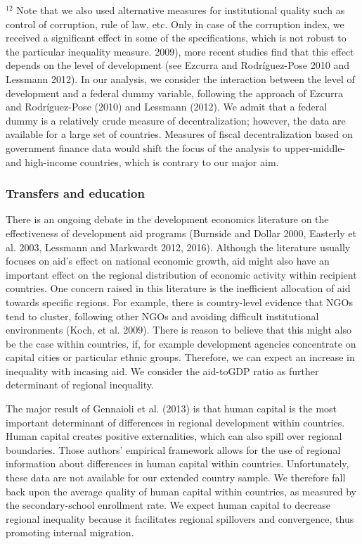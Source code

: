 \documentclass[10pt]{article}
\begin{document}
${ }^{12}$ Note that we also used alternative measures for institutional quality such as control of corruption, rule of law, etc. Only in case of the corruption index, we received a significant effect in some of the specifications, which is not robust to the particular inequality measure. 2009), more recent studies find that this effect depends on the level of development (see Ezcurra and Rodríguez-Pose 2010 and Lessmann 2012). In our analysis, we consider the interaction between the level of development and a federal dummy variable, following the approach of Ezcurra and Rodríguez-Pose (2010) and Lessmann (2012). We admit that a federal dummy is a relatively crude measure of decentralization; however, the data are available for a large set of countries. Measures of fiscal decentralization based on government finance data would shift the focus of the analysis to upper-middle- and high-income countries, which is contrary to our major aim.

\subsubsection{Transfers and education}
There is an ongoing debate in the development economics literature on the effectiveness of development aid programs (Burnside and Dollar 2000, Easterly et al. 2003, Lessmann and Markwardt 2012, 2016). Although the literature usually focuses on aid's effect on national economic growth, aid might also have an important effect on the regional distribution of economic activity within recipient countries. One concern raised in this literature is the inefficient allocation of aid towards specific regions. For example, there is country-level evidence that NGOs tend to cluster, following other NGOs and avoiding difficult institutional environments (Koch, et al. 2009). There is reason to believe that this might also be the case within countries, if, for example development agencies concentrate on capital cities or particular ethnic groups. Therefore, we can expect an increase in inequality with incasing aid. We consider the aid-toGDP ratio as further determinant of regional inequality.

The major result of Gennaioli et al. (2013) is that human capital is the most important determinant of differences in regional development within countries. Human capital creates positive externalities, which can also spill over regional boundaries. Those authors' empirical framework allows for the use of regional information about differences in human capital within countries. Unfortunately, these data are not available for our extended country sample. We therefore fall back upon the average quality of human capital within countries, as measured by the secondary-school enrollment rate. We expect human capital to decrease regional inequality because it facilitates regional spillovers and convergence, thus promoting internal migration.
\end{document}
